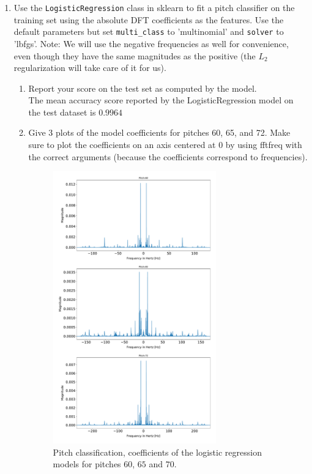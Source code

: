 \documentclass[12pt,twoside]{article}
\begin{document}
\begin{enumerate}
\begin{enumerate}
\begin{enumerate}
    \end{enumerate}
  \item Use the \texttt{LogisticRegression} class in sklearn to fit a
    pitch classifier on the training set using the absolute DFT
    coefficients as the features.  Use the default parameters
    but set \texttt{multi\_class} to 'multinomial' and
    \texttt{solver} to 'lbfgs'.  Note: We will use the negative
    frequencies as well for convenience, even though they have the same magnitudes as
    the positive (the $L_2$ regularization will take care of it for us).
    \begin{enumerate}
    \item Report your score on the test set as computed by the model.\\
    The mean accuracy score reported by the LogisticRegression model on the test dataset is $0.9964$
    
    \item Give 3 plots of the model coefficients for pitches 60, 65, and 72.
      Make sure to plot the coefficients on an axis centered at $0$ by using
      fftfreq with the correct arguments (because the coefficients
      correspond to frequencies).\\

	\begin{figure}[H]
		\centering
		\captionsetup{justification=centering}
		\includegraphics[width=200pt]{code/musicdata/pitch_classification.pdf}
		\caption{Pitch classification, coefficients of the logistic regression models for pitches $60$, $65$ and $70$.}
	\end{figure}

      
    \end{enumerate}
  \end{enumerate}

 \end{enumerate}
\end{document}
